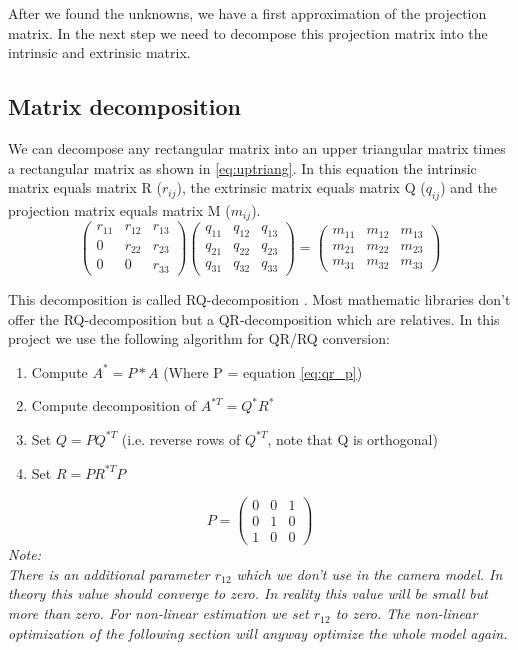 \documentclass[11pt,a4paper,titlepage,oneside]{report}
\begin{document}
After we found the unknowns, we have a first approximation of the projection matrix. In the next step we need to decompose this projection matrix into the intrinsic and extrinsic matrix.\\

\subsection{Matrix decomposition}\label{sec:matrix_dec}
We can decompose any rectangular matrix into an upper triangular matrix times a rectangular matrix as shown in \ref{eq:uptriang}. In this equation the intrinsic matrix equals matrix R ($r_{ij}$), the extrinsic matrix equals matrix Q ($q_{ij}$) and the projection matrix equals matrix M ($m_{ij}$).
\begin{equation}\label{eq:uptriang}
	\begin{pmatrix}
		r_{11} & r_{12} & r_{13}\\
		0 & r_{22} & r_{23}\\
		0 & 0 & r_{33}
	\end{pmatrix}
	\begin{pmatrix}
		q_{11} & q_{12} & q_{13}\\
		q_{21} & q_{22} & q_{23}\\
		q_{31} & q_{32} & q_{33}
	\end{pmatrix}=
	\begin{pmatrix}
		m_{11} & m_{12} & m_{13}\\
		m_{21} & m_{22} & m_{23}\\
		m_{31} & m_{32} & m_{33}
	\end{pmatrix}
\end{equation}

This decomposition is called RQ-decomposition \cite{qr_decomposition}. Most mathematic libraries don't offer the RQ-decomposition but a QR-decomposition which are relatives. In this project we use the following algorithm \cite{rq_stack} for QR/RQ conversion:
\begin{enumerate}
	\item Compute $A^{*}=P*A$ (Where P = equation \ref{eq:qr_p})
	\item Compute decomposition of $A^{*T}=Q^*R^*$
	\item Set $Q=PQ^{*T}$ (i.e. reverse rows of $Q^{*T}$, note that Q is orthogonal)
	\item Set $R=PR^{*T}P$
\end{enumerate}

\begin{equation}\label{eq:qr_p}
	P=\begin{pmatrix}
		0 & 0 & 1\\
		0 & 1 & 0\\
		1 & 0 & 0
	\end{pmatrix}
\end{equation}
\em
Note:\\
There is an additional parameter $r_{12}$ which we don't use in the camera model. In theory this value should converge to zero. In reality this value will be small but more than zero. For non-linear estimation we set $r_{12}$ to zero. The non-linear optimization of the following section will anyway optimize the whole model again.
\normalfont
\end{document}
